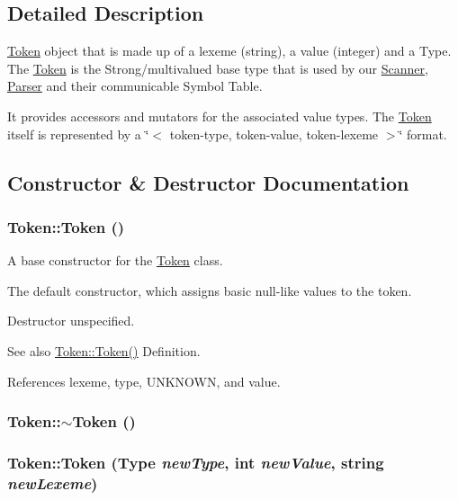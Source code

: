 \subsection{Detailed Description}
\hyperlink{classToken}{Token} object that is made up of a lexeme (string), a value (integer) and a Type. The \hyperlink{classToken}{Token} is the Strong/multivalued base type that is used by our \hyperlink{classScanner}{Scanner}, \hyperlink{classParser}{Parser} and their communicable Symbol Table.

It provides accessors and mutators for the associated value types. The \hyperlink{classToken}{Token} itself is represented by a \char`\"{}$<$ token-\/type, token-\/value, token-\/lexeme $>$\char`\"{} format. 

\subsection{Constructor \& Destructor Documentation}
\hypertarget{classToken_aa3c5868ba4115f3189df6b2ac5b36f39}{
\subsubsection[{Token}]{\setlength{\rightskip}{0pt plus 5cm}Token::Token ()}}
\label{classToken_aa3c5868ba4115f3189df6b2ac5b36f39}


A base constructor for the \hyperlink{classToken}{Token} class. 

The default constructor, which assigns basic null-\/like values to the token.

Destructor unspecified. \begin{DoxySeeAlso}{See also}
\hyperlink{classToken_aa3c5868ba4115f3189df6b2ac5b36f39}{Token::Token()} Definition.
\end{DoxySeeAlso}


References lexeme, type, UNKNOWN, and value.

\hypertarget{classToken_a3d7d59eaac1535df1433357d5d372f84}{
\subsubsection[{$\sim$Token}]{\setlength{\rightskip}{0pt plus 5cm}Token::$\sim$Token ()}}
\label{classToken_a3d7d59eaac1535df1433357d5d372f84}
\hypertarget{classToken_abe7d4640c0784e490bccaa254f11a8d9}{
\subsubsection[{Token}]{\setlength{\rightskip}{0pt plus 5cm}Token::Token ({\bf Type} {\em newType}, \/  int {\em newValue}, \/  string {\em newLexeme})}}
\label{classToken_abe7d4640c0784e490bccaa254f11a8d9}


